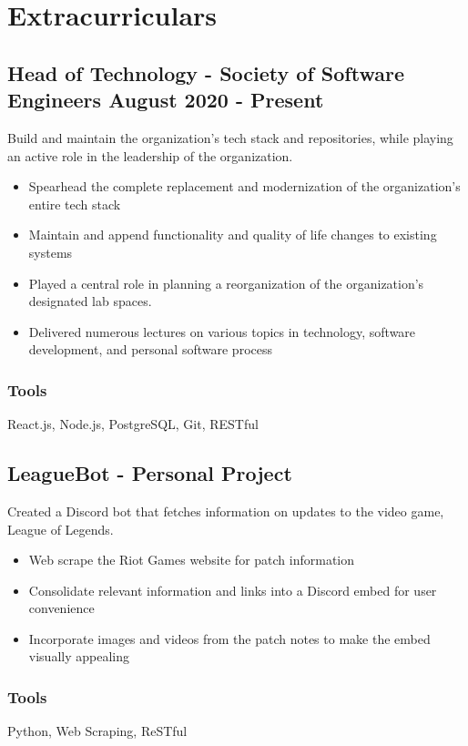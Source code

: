 \documentclass[11pt, letterpaper]{article}
\begin{document}
    \section{Extracurriculars}
        \subsection{Head of Technology - Society of Software Engineers \hfill August 2020 - Present}
            Build and maintain the organization's tech stack and repositories, while playing an active role in 
            the leadership of the organization. 
            \begin{itemize}[nosep]
                \item Spearhead the complete replacement and modernization of the organization's 
                        entire tech stack
                \item Maintain and append functionality and quality of life changes to existing systems 
                \item Played a central role in planning a reorganization of the organization's designated lab
                        spaces. 
                \item Delivered numerous lectures on various topics in technology, software development, 
                        and personal software process
            \end{itemize}
            \subsubsection{Tools}
                React.js, Node.js, PostgreSQL, Git, RESTful
            \vspace{.5em}

        \subsection{LeagueBot - Personal Project}
            Created a Discord bot that fetches information on updates to the video game, League 
            of Legends.
            \begin{itemize}[nosep]
                \item Web scrape the Riot Games website for patch information
                \item Consolidate relevant information and links into a Discord embed for user convenience
                \item Incorporate images and videos from the patch notes to make the embed visually appealing
            \end{itemize}
            \subsubsection{Tools}
                Python, Web Scraping, ReSTful
\end{document}
